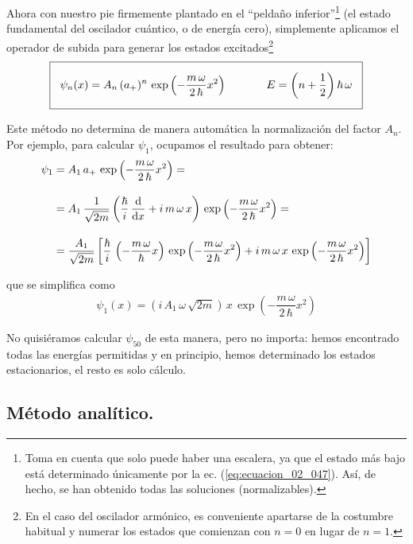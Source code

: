 Ahora con nuestro pie firmemente plantado en el \enquote{peldaño inferior}\footnote{Toma en cuenta que solo puede haber una escalera, ya que el estado más bajo está determinado únicamente por la ec. (\ref{eq:ecuacion_02_047}). Así, de hecho, se han obtenido todas las soluciones (normalizables).} (el estado fundamental del oscilador cuántico, o de energía cero), simplemente aplicamos el operador de subida para generar los estados excitados\footnote{ En el caso del oscilador armónico, es conveniente apartarse de la costumbre habitual y numerar los estados que comienzan con $n = 0$ en lugar de $n = 1$.}
\begin{align}
\setlength{\fboxsep}{3\fboxsep}\boxed{ \psi_{n} (x) = A_{n} \, (a_{+})^{n} \, \exp \left( - \dfrac{m \, \omega}{2 \, \hbar} x^{2} \right) \hspace{1.25cm} E = \left( n + \dfrac{1}{2} \right) \hbar \, \omega}
\label{eq:ecuacion_02_050}
\end{align}

Este método no determina de manera automática la normalización del factor $A_{n}$. Por ejemplo, para calcular $\psi_{1}$, ocupamos el resultado para obtener:
\begin{align*}
\psi_{1} &= A_{1} \, a_{+} \, \exp \left( - \dfrac{m \, \omega}{2 \, \hbar} x^{2} \right) = \\[1em]
&= A_{1} \, \dfrac{1}{\sqrt{2 m}} \left( \dfrac{\hbar}{i} \, \dv{x} + i \, m \, \omega \, x \right) \, \exp \left( - \dfrac{m \, \omega}{2 \, \hbar} x^{2} \right) = \\[1em]
&= \dfrac{A_{1}}{\sqrt{2 m}} \left[ \dfrac{\hbar}{i} \, \left( - \dfrac{m \, \omega}{\hbar} x \right)  \, \exp \left( - \dfrac{m \, \omega}{2 \, \hbar} x^{2} \right) + i \, m \, \omega \, x \, \exp \left( - \dfrac{m \, \omega}{2 \, \hbar} x^{2} \right) \right] 
\end{align*}

que se simplifica como
\begin{align}
\psi_{1} (x) = \left( i \, A_{1} \, \omega \, \sqrt{2 m} \right) \, x \, \exp \left( - \dfrac{m \, \omega}{2 \, \hbar} x^{2} \right)
\label{eq:ecuacion_02_051}
\end{align}

No quisiéramos calcular $\psi_{50}$ de esta manera, pero no importa: hemos encontrado todas las energías permitidas y en principio, hemos determinado los estados estacionarios, el resto es solo cálculo.

\subsection{Método analítico.}

